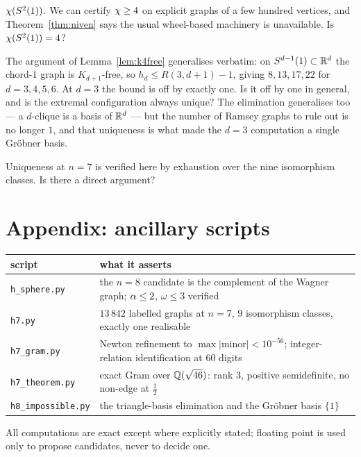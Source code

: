 \begin{problem}
$\chi(S^2(1))$. We can certify $\chi\ge4$ on explicit graphs of a few
hundred vertices, and Theorem~\ref{thm:niven} says the usual wheel-based machinery is
unavailable. Is $\chi(S^2(1))=4$?
\end{problem}

\begin{problem}
The argument of Lemma~\ref{lem:k4free} generalises verbatim: on $S^{d-1}(1)\subset
\mathbb{R}^d$ the chord-$1$ graph is $K_{d+1}$-free, so
$h_d\le R(3,d+1)-1$, giving $8,13,17,22$ for $d=3,4,5,6$. At $d=3$ the bound is
off by exactly one. Is it off by one in general, and is the extremal
configuration always unique? The elimination generalises too --- a $d$-clique is
a basis of $\mathbb{R}^d$ --- but the number of Ramsey graphs to rule out is no longer
$1$, and that uniqueness is what made the $d=3$ computation a single Gr\"obner
basis.
\end{problem}

\begin{problem}
Uniqueness at $n=7$ is verified here by exhaustion over the nine isomorphism
classes. Is there a direct argument?
\end{problem}

\section{Appendix: ancillary scripts}
\label{sec:ancillaryB}

\begin{center}
\begin{tabular}{@{}lp{7.6cm}@{}}
\toprule
script & what it asserts \\
\midrule
\texttt{h\_sphere.py} & the $n=8$ candidate is the complement of the Wagner
graph; $\alpha\le2$, $\omega\le3$ verified \\
\texttt{h7.py} & $13\,842$ labelled graphs at $n=7$, $9$ isomorphism classes,
exactly one realisable \\
\texttt{h7\_gram.py} & Newton refinement to $\max|\text{minor}|<10^{-56}$;
integer-relation identification at $60$ digits \\
\texttt{h7\_theorem.py} & exact Gram over $\mathbb{Q}(\sqrt{46})$: rank $3$, positive
semidefinite, no non-edge at $\tfrac12$ \\
\texttt{h8\_impossible.py} & the triangle-basis elimination and the Gr\"obner
basis $\{1\}$ \\
\bottomrule
\end{tabular}
\end{center}

All computations are exact except where explicitly stated; floating point is
used only to propose candidates, never to decide one.

